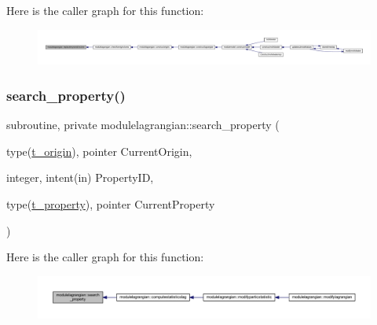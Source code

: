 Here is the caller graph for this function\+:\nopagebreak
\begin{figure}[H]
\begin{center}
\leavevmode
\includegraphics[width=350pt]{namespacemodulelagrangian_a6f0ed297af020601a6d8ac70faef5cae_icgraph}
\end{center}
\end{figure}
\mbox{\label{namespacemodulelagrangian_a507e0e8500a409a6449e91da89ba4420}} 
\subsubsection{\texorpdfstring{search\+\_\+property()}{search\_property()}}
{\footnotesize\ttfamily subroutine, private modulelagrangian\+::search\+\_\+property (\begin{DoxyParamCaption}\item[{type(\mbox{\hyperlink{structmodulelagrangian_1_1t__origin}{t\+\_\+origin}}), pointer}]{Current\+Origin,  }\item[{integer, intent(in)}]{Property\+ID,  }\item[{type(\mbox{\hyperlink{structmodulelagrangian_1_1t__property}{t\+\_\+property}}), pointer}]{Current\+Property }\end{DoxyParamCaption})\hspace{0.3cm}{\ttfamily [private]}}

Here is the caller graph for this function\+:\nopagebreak
\begin{figure}[H]
\begin{center}
\leavevmode
\includegraphics[width=350pt]{namespacemodulelagrangian_a507e0e8500a409a6449e91da89ba4420_icgraph}
\end{center}
\end{figure}
\mbox{\label{namespacemodulelagrangian_a219357c04fe0cbde7c3506f0fdb4ec61}} 
